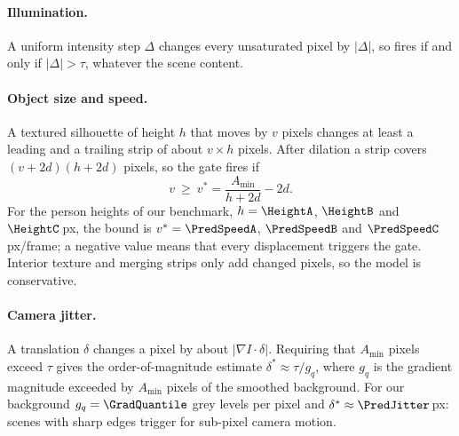 \paragraph{Illumination.} A uniform intensity step $\Delta$ changes every unsaturated pixel by $|\Delta|$, so \FD{} fires if and only if $|\Delta|>\tau$, whatever the scene content.

\paragraph{Object size and speed.} A textured silhouette of height $h$ that moves by $v$ pixels changes at least a leading and a trailing strip of about $v\times h$ pixels. After dilation a strip covers $(v+2d)(h+2d)$ pixels, so the gate fires if
\begin{equation}\label{eq:area}
v\ \ge\ v^*=\frac{A_{\min}}{h+2d}-2d .
\end{equation}
For the person heights of our benchmark, $h=\HeightA$, $\HeightB$ and $\HeightC$\,px, the bound is $v^*=\PredSpeedA$, $\PredSpeedB$ and $\PredSpeedC$\,px/frame; a negative value means that every displacement triggers the gate. Interior texture and merging strips only add changed pixels, so the model is conservative.

\paragraph{Camera jitter.} A translation $\delta$ changes a pixel by about $|\nabla I\cdot\delta|$. Requiring that $A_{\min}$ pixels exceed $\tau$ gives the order-of-magnitude estimate $\delta^*\approx\tau/g_q$, where $g_q$ is the gradient magnitude exceeded by $A_{\min}$ pixels of the smoothed background. For our background $g_q=\GradQuantile$ grey levels per pixel and $\delta^*\approx\PredJitter$\,px: scenes with sharp edges trigger \FD{} for sub-pixel camera motion.

